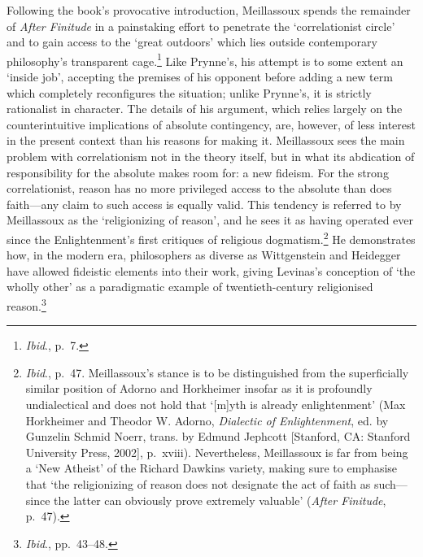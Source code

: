\documentclass[]{article}
\begin{document}
Following the book’s provocative introduction, Meillassoux spends the
remainder of \emph{After Finitude} in a painstaking effort to penetrate
the ‘correlationist circle’ and to gain access to the ‘great outdoors’
which lies outside contemporary philosophy’s transparent cage.\footnote{\emph{Ibid}.,
  p.~7.} Like Prynne’s, his attempt is to some extent an ‘inside job’,
accepting the premises of his opponent before adding a new term which
completely reconfigures the situation; unlike Prynne’s, it is strictly
rationalist in character. The details of his argument, which relies
largely on the counterintuitive implications of absolute contingency,
are, however, of less interest in the present context than his reasons
for making it. Meillassoux sees the main problem with correlationism not
in the theory itself, but in what its abdication of responsibility for
the absolute makes room for: a new fideism. For the strong
correlationist, reason has no more privileged access to the absolute
than does faith—any claim to such access is equally valid. This tendency
is referred to by Meillassoux as the ‘religionizing of reason’, and he
sees it as having operated ever since the Enlightenment’s first
critiques of religious dogmatism.\footnote{\emph{Ibid}., p.~47.
  Meillassoux’s stance is to be distinguished from the superficially
  similar position of Adorno and Horkheimer insofar as it is profoundly
  undialectical and does not hold that ‘{[}m{]}yth is already
  enlightenment’ (Max Horkheimer and Theodor W. Adorno, \emph{Dialectic
  of Enlightenment}, ed. by Gunzelin Schmid Noerr, trans. by Edmund
  Jephcott {[}Stanford, CA: Stanford University Press, 2002{]},
  p.~xviii). Nevertheless, Meillassoux is far from being a ‘New Atheist’
  of the Richard Dawkins variety, making sure to emphasise that ‘the
  religionizing of reason does not designate the act of faith as
  such—since the latter can obviously prove extremely valuable’
  (\emph{After Finitude}, p.~47).} He demonstrates how, in the modern
era, philosophers as diverse as Wittgenstein and Heidegger have allowed
fideistic elements into their work, giving Levinas’s conception of ‘the
wholly other’ as a paradigmatic example of twentieth-century
religionised reason.\footnote{\emph{Ibid}., pp.~43–48.}
\end{document}
